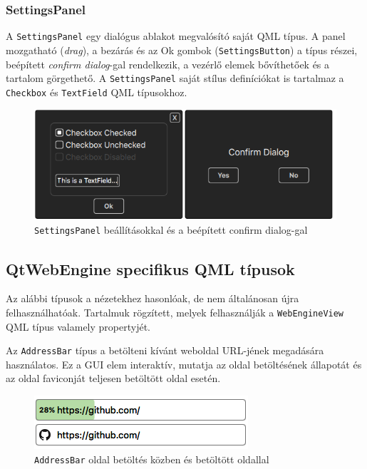 \documentclass[12pt]{report}
\begin{document}
\subsubsection{SettingsPanel}
A \texttt{SettingsPanel} egy dialógus ablakot megvalósító saját QML típus. A panel
mozgatható (\textit{drag}), a bezárás és az Ok gombok (\texttt{SettingsButton}) a típus
részei, beépített \textit{confirm dialog}-gal rendelkezik, a vezérlő elemek bővíthetőek
és a tartalom görgethető. A \texttt{SettingsPanel} saját stílus definíciókat is tartalmaz
a \texttt{Checkbox} és \texttt{TextField} QML típusokhoz.

\begin{figure}[H]
    \centering
    \includegraphics[scale=0.7]{SettingsPanel}
    \caption{
        \label{fig:settings-panel}
        \texttt{SettingsPanel} beállításokkal és a beépített confirm dialog-gal
    }
\end{figure}

\subsection{QtWebEngine specifikus QML típusok}
Az alábbi típusok a nézetekhez hasonlóak, de nem általánosan újra felhasználhatóak.
Tartalmuk rögzített, melyek felhasználják a \texttt{WebEngineView} QML típus valamely
propertyjét.

Az \texttt{AddressBar} típus a betölteni kívánt weboldal URL-jének megadására használatos.
Ez a GUI elem interaktív, mutatja az oldal betöltésének állapotát és az oldal faviconját
teljesen betöltött oldal esetén.
\begin{figure}[H]
    \centering
    \includegraphics[scale=0.8]{AddressBar}
    \caption{
        \label{fig:address-bar}
        \texttt{AddressBar} oldal betöltés közben és betöltött oldallal
    }
\end{figure}
\end{document}
